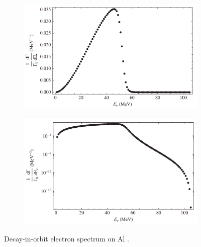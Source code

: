 \begin{figure}[!h]
     \begin{subfigure}[b]{0.4\linewidth}
         \centering
         \includegraphics[scale = 0.18]{figures/png/Screenshot_20240222_175415.png}
         \label{fig:linearscalemichel}
     \end{subfigure}
     \begin{subfigure}[b]{0.7\linewidth}
         \centering
         \includegraphics[scale = 0.18]{figures/png/Screenshot_20240222_175446.png}
         \label{fig:logscalemichel}
     \end{subfigure}
     \caption[Decay-in-orbit spectrum on aluminium.]{
       Decay-in-orbit electron spectrum on Al \cite{PhysRevD.84.013006}.}
        \label{fig:michel}
\end{figure}

